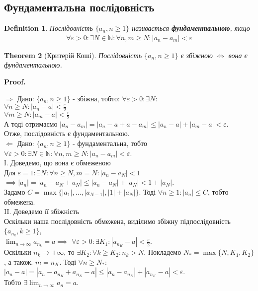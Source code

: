 \documentclass[a4paper, 14pt]{article}
\makeatletter
\def\qed{$\blacksquare$}
\def\rightproof{$\boxed{\Rightarrow}$ }
\def\leftproof{$\boxed{\Leftarrow}$ }
\theoremstyle{theoremdd}
\newtheorem{theorem}{Theorem}[subsection]
\theoremstyle{theoremdd}
\newtheorem{definition}[theorem]{Definition}
\theoremstyle{theoremdd}
\theoremstyle{theoremdd}
\theoremstyle{theoremdd}
\theoremstyle{theoremdd}
\theoremstyle{theoremdd}
\theoremstyle{theoremdd}
\renewenvironment{proof}[1][Proof.\\]{\par
\pushQED{\hfill \qed}%
\normalfont \topsep6\p@\@plus6\p@\relax
\trivlist
\item\relax
{\bfseries
#1\@addpunct{.}}\hspace\labelsep\ignorespaces
}{%
\popQED\endtrivlist\@endpefalse
}
\makeatother
\begin{document}
	\subsection{Фундаментальна послідовність}
	\begin{definition}
	Послідовність $\{a_n, n \geq 1\}$ називається \textbf{фундаментальною}, якщо
	\begin{align*}
	\forall \varepsilon > 0: \exists N \in \mathbb{N}: \forall n,m \geq N: |a_n - a_m| < \varepsilon
	\end{align*}
	\end{definition}
	
	\begin{theorem}[Критерій Коші]
	Послідовність $\{a_n, n \geq 1\}$ є збіжною $\iff$ вона є фундаментальною.
	\end{theorem}
	
	\begin{proof}
	\rightproof Дано: $\{a_n,n \geq 1\}$ - збіжна, тобто: $\forall \varepsilon >0: \exists N: $\\
	$\displaystyle \forall n \geq N: |a_n - a| < \frac{\varepsilon}{2}$\\
	$\displaystyle \forall m \geq N: |a_m - a| < \frac{\varepsilon}{2}$\\
	А тоді отримаємо $|a_n - a_m| = |a_n - a + a - a_m| \leq |a_n - a| + |a_m - a| < \varepsilon$.\\
	Отже, послідовність є фундаментальною.
	\bigskip \\
	
	\leftproof Дано: $\{a_n, n \geq 1\}$ - фундаментальна, тобто $\forall \varepsilon > 0: \exists N \in \mathbb{N}: \forall n,m \geq N: |a_n - a_m| < \varepsilon$.\\
	І. Доведемо, що вона є обмеженою\\
	Для $\varepsilon = 1: \exists N: \forall n \geq N, m = N: |a_n - a_N| < 1$\\
	$\implies |a_n| = |a_n - a_N + a_N| \leq |a_n - a_N| + |a_N| < 1 + |a_N|$.\\
	Задамо $C = \max\{|a_1|, \dots, |a_{N-1}|, |1|+|a_N|\}$. Тоді $\forall n \geq 1: |a_n| \leq C$, тобто обмежена.
	\bigskip \\
	II. Доведемо її збіжність\\
	Оскільки наша послідовність обмежена, виділимо збіжну підпослідовність $\{a_{n_k}, k \geq 1\}$, \\ $\displaystyle \lim_{n \to \infty} a_{n_k} = a \implies$
	$\displaystyle \forall \varepsilon > 0: \exists K_1: |a_{n_K} - a| < \frac{\varepsilon}{2}$.\\
	Оскільки $n_k \to +\infty$, то $\exists K_2: \forall k \geq K_2: n_k > N$.
	Покладемо $N_* = \max\{N,K_1,K_2\}$, а також. $m = n_K$. Тоді $\forall n \geq N_*$: $|a_n - a| = |a_n - a_{n_K} + a_{n_K} - a| \leq |a_n - a_{n_K}| + |a_{n_K} - a| < \varepsilon$.\\
	Тобто $\displaystyle \exists \lim_{n \to \infty} a_n = a$.
	\end{proof}
	
\end{document}
